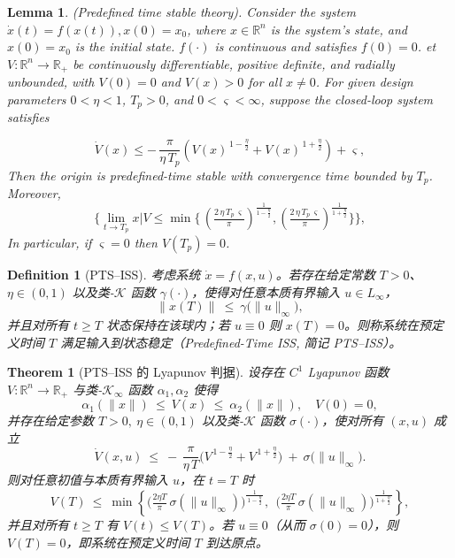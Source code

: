 \documentclass[pdflatex,sn-mathphys-num]{sn-jnl}%
\theoremstyle{thmstyleone}%
\newtheorem{theorem}{Theorem}%
\newtheorem{lemma}{Lemma}
\theoremstyle{thmstyletwo}%
\theoremstyle{thmstylethree}%
\newtheorem{definition}{Definition}%
\begin{document}
\begin{lemma} \label{lemma:1}\cite{WangEtAl_2022_Adaptivefuzzy} (Predefined time stable theory). Consider the system $
	\dot{x}(t) = f(x(t)), x(0) = x_0
$, where $x \in \mathbb{R}^n$ is the system's state, and $x(0) = x_0$ is the initial state. $f(\cdot)$ is continuous and satisfies $f(0) = 0$. et $V:\mathbb{R}^n\to\mathbb{R}_+$ be continuously differentiable, positive definite, and radially unbounded, with $V(0)=0$ and $V(x)>0$ for all $x\neq 0$.
For given design parameters $0<\eta<1$, $T_p>0$, and $0<\varsigma<\infty$, suppose the closed-loop system satisfies
			  
\begin{equation}	\label{eq:7}
	\dot V(x) \le
	-\,\frac{\pi}{\eta\,T_p}\left(V(x)^{\,1-\frac{\eta}{2}}+V(x)^{\,1+\frac{\eta}{2}}\right)
	+\varsigma,
\end{equation}
Then the origin is predefined-time stable with convergence time bounded by $T_p$. Moreover,
\begin{equation}\label{eq:8}
	\Biggl\{ \lim_{t\to T_p} x|V
	\le
	\min\!\Biggl\{\,
	\left(\tfrac{2\,\eta\,T_p\,\varsigma}{\pi}\right)^{\frac{1}{1-\frac{\eta}{2}}}\!,
	\left(\tfrac{2\,\eta\,T_p\,\varsigma}{\pi}\right)^{\frac{1}{1+\frac{\eta}{2}}}
	\Biggr\} \Biggr\},
\end{equation}
In particular, if $\varsigma=0$ then $V(T_p)=0$.
\end{lemma}



\begin{definition}[PTS--ISS]\label{def:PTS-ISS}
	考虑系统 $\dot x = f(x,u)$。若存在给定常数 $T>0$、$\eta\in(0,1)$ 以及类-$\mathcal{K}$ 函数 $\gamma(\cdot)$，使得对任意本质有界输入 $u\in L_\infty$，
	\[
	\|x(T)\|\ \le\ \gamma\big(\|u\|_\infty\big),
	\]
	并且对所有 $t\ge T$ 状态保持在该球内；若 $u\equiv 0$ 则 $x(T)=0$。则称系统在预定义时间 $T$ 满足输入到状态稳定（Predefined-Time ISS, 简记 PTS--ISS）。
	\end{definition}
	
	\begin{theorem}[PTS--ISS 的 Lyapunov 判据]\label{thm:PTS-ISS}
	设存在 $C^1$ Lyapunov 函数 $V:\mathbb{R}^n\to\mathbb{R}_+$ 与类-$\mathcal{K}_\infty$ 函数 $\alpha_1,\alpha_2$ 使得
	\[
	\alpha_1(\|x\|)\ \le\ V(x)\ \le\ \alpha_2(\|x\|),\quad V(0)=0,
	\]
	并存在给定参数 $T>0,\ \eta\in(0,1)$ 以及类-$\mathcal{K}$ 函数 $\sigma(\cdot)$，使对所有 $(x,u)$ 成立
	\begin{equation}\label{eq:PTS-ISS-core}
	\dot V(x,u)\ \le\ -\,\frac{\pi}{\eta\,T}\Big(V^{\,1-\frac{\eta}{2}}+V^{\,1+\frac{\eta}{2}}\Big)\ +\ \sigma\big(\|u\|_\infty\big).
	\end{equation}
	则对任意初值与本质有界输入 $u$，在 $t=T$ 时
	\begin{equation}\label{eq:PTS-ISS-bound}
	V(T)\ \le\ \min\!\left\{
	\Big(\tfrac{2\eta T}{\pi}\,\sigma(\|u\|_\infty)\Big)^{\!\frac{1}{\,1-\frac{\eta}{2}\,}},
	\ \ 
	\Big(\tfrac{2\eta T}{\pi}\,\sigma(\|u\|_\infty)\Big)^{\!\frac{1}{\,1+\frac{\eta}{2}\,}}
	\right\},
	\end{equation}
	并且对所有 $t\ge T$ 有 $V(t)\le V(T)$。若 $u\equiv 0$（从而 $\sigma(0)=0$），则 $V(T)=0$，即系统在预定义时间 $T$ 到达原点。
	\end{theorem}
	
\end{document}
